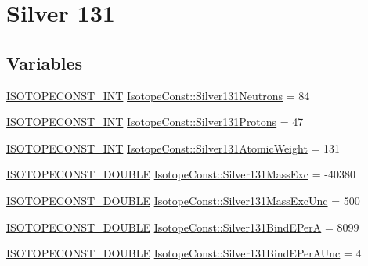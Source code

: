 \hypertarget{group___isotope_const-_silver-_ag131}{}\section{Silver 131}
\label{group___isotope_const-_silver-_ag131}
\subsection*{Variables}
\begin{DoxyCompactItemize}
\item 
\mbox{\hyperlink{group___isotope_const-_macros_ga5f18360b3e99483a35c32d789e62621c}{I\+S\+O\+T\+O\+P\+E\+C\+O\+N\+S\+T\+\_\+\+I\+NT}} \mbox{\hyperlink{group___isotope_const-_silver-_ag131_ga4af4d88ea139b854034255ce9a64eeb3}{Isotope\+Const\+::\+Silver131\+Neutrons}} = 84
\item 
\mbox{\hyperlink{group___isotope_const-_macros_ga5f18360b3e99483a35c32d789e62621c}{I\+S\+O\+T\+O\+P\+E\+C\+O\+N\+S\+T\+\_\+\+I\+NT}} \mbox{\hyperlink{group___isotope_const-_silver-_ag131_gaa974ac703491fcfdc85cef6be336f52f}{Isotope\+Const\+::\+Silver131\+Protons}} = 47
\item 
\mbox{\hyperlink{group___isotope_const-_macros_ga5f18360b3e99483a35c32d789e62621c}{I\+S\+O\+T\+O\+P\+E\+C\+O\+N\+S\+T\+\_\+\+I\+NT}} \mbox{\hyperlink{group___isotope_const-_silver-_ag131_ga85ac73e07407b908e1db96719c02bf04}{Isotope\+Const\+::\+Silver131\+Atomic\+Weight}} = 131
\item 
\mbox{\hyperlink{group___isotope_const-_macros_ga8f45a7272ce02c0b4c65c44636ed719a}{I\+S\+O\+T\+O\+P\+E\+C\+O\+N\+S\+T\+\_\+\+D\+O\+U\+B\+LE}} \mbox{\hyperlink{group___isotope_const-_silver-_ag131_gada03d566677dd4624c33c71ba6aeba64}{Isotope\+Const\+::\+Silver131\+Mass\+Exc}} = -\/40380
\item 
\mbox{\hyperlink{group___isotope_const-_macros_ga8f45a7272ce02c0b4c65c44636ed719a}{I\+S\+O\+T\+O\+P\+E\+C\+O\+N\+S\+T\+\_\+\+D\+O\+U\+B\+LE}} \mbox{\hyperlink{group___isotope_const-_silver-_ag131_ga306667ef9ba620428358a4886650437a}{Isotope\+Const\+::\+Silver131\+Mass\+Exc\+Unc}} = 500
\item 
\mbox{\hyperlink{group___isotope_const-_macros_ga8f45a7272ce02c0b4c65c44636ed719a}{I\+S\+O\+T\+O\+P\+E\+C\+O\+N\+S\+T\+\_\+\+D\+O\+U\+B\+LE}} \mbox{\hyperlink{group___isotope_const-_silver-_ag131_ga58c9fa048100cad4e81b730f42803a81}{Isotope\+Const\+::\+Silver131\+Bind\+E\+PerA}} = 8099
\item 
\mbox{\hyperlink{group___isotope_const-_macros_ga8f45a7272ce02c0b4c65c44636ed719a}{I\+S\+O\+T\+O\+P\+E\+C\+O\+N\+S\+T\+\_\+\+D\+O\+U\+B\+LE}} \mbox{\hyperlink{group___isotope_const-_silver-_ag131_ga4cf7627029d3692ba331b4a3a1ff1d8e}{Isotope\+Const\+::\+Silver131\+Bind\+E\+Per\+A\+Unc}} = 4

\end{DoxyCompactItemize}

